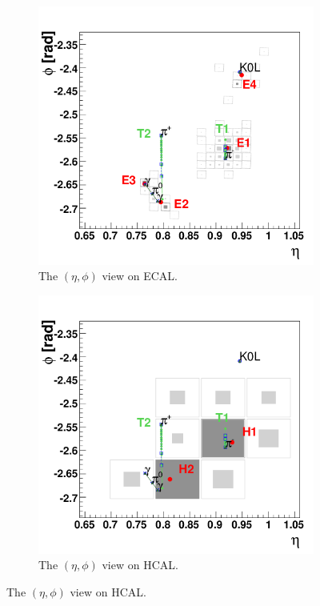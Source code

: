\begin{figure}
	\begin{subfigure}{.4\textwidth}
		\centering
		\includegraphics[width=.8\linewidth]{analysis/pics/PF_b.png}
		\caption{The $(\eta,\phi)$ view on ECAL.}
		\label{fig:PF_b}
	\end{subfigure}
	\begin{subfigure}{.4\textwidth}
		\centering
		\includegraphics[width=.8\linewidth]{analysis/pics/PF_c.png}
		\caption{The $(\eta,\phi)$ view on HCAL.}
		\label{fig:PF_c}
	\end{subfigure}%

\end{figure}

